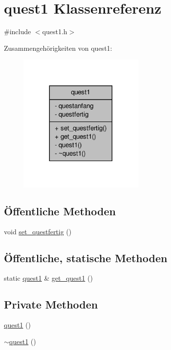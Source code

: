 \hypertarget{classquest1}{\section{quest1 Klassenreferenz}
\label{classquest1}
}


{\ttfamily \#include $<$quest1.\-h$>$}



Zusammengehörigkeiten von quest1\-:
\nopagebreak
\begin{figure}[H]
\begin{center}
\leavevmode
\includegraphics[width=176pt]{classquest1__coll__graph}
\end{center}
\end{figure}
\subsection*{Öffentliche Methoden}
\begin{DoxyCompactItemize}
\item 
void \hyperlink{classquest1_a0d15ef2a709da84e40eeebfe9d013ca2}{set\-\_\-questfertig} ()
\end{DoxyCompactItemize}
\subsection*{Öffentliche, statische Methoden}
\begin{DoxyCompactItemize}
\item 
static \hyperlink{classquest1}{quest1} \& \hyperlink{classquest1_a042d65f81c5ab7a6766dacd68f268613}{get\-\_\-quest1} ()
\end{DoxyCompactItemize}
\subsection*{Private Methoden}
\begin{DoxyCompactItemize}
\item 
\hyperlink{classquest1_afb01a1bb99167a7dabcf88741251816f}{quest1} ()
\item 
\hyperlink{classquest1_a86f8181a0592448e214f9202c0f6c5f5}{$\sim$quest1} ()
\end{DoxyCompactItemize}
